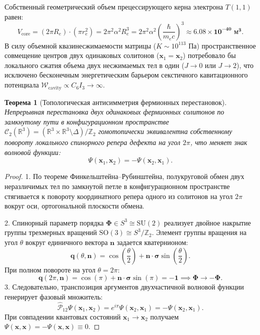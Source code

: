 \documentclass[11pt,a4paper]{article}
\newtheorem{theorem}{Теорема}[section]
\theoremstyle{definition}
\theoremstyle{remark}
\begin{document}
Собственный геометрический объем прецессирующего керна электрона $T(1,1)$ равен:
\begin{equation}
    V_{\mathrm{core}} = (2\pi R_e) \cdot (\pi r_e^2) = 2\pi^2 \alpha^2 R_e^3 = 2\pi^2 \alpha^2 \left( \frac{\hbar}{m_e c} \right)^3 \approx \mathbf{6.08 \times 10^{-40}\text{ м}^3}.
\end{equation}
В силу объемной квазинесжимаемости матрицы ($K \sim 10^{113}\text{ Па}$) пространственное совмещение центров двух одинаковых солитонов ($\mathbf{x}_1 = \mathbf{x}_2$) потребовало бы локального сжатия объема двух несжимаемых тел в один ($J \to 0$ или $J \to 2$), что исключено бесконечным энергетическим барьером секстичного кавитационного потенциала $\mathcal{W}_{\mathrm{cavity}} \propto C_6 I_3 \to \infty$.

\begin{theorem}[Топологическая антисимметрия фермионных перестановок]
Непрерывная перестановка двух одинаковых фермионных солитонов по замкнутому пути в конфигурационном пространстве $\mathcal{C}_2(\mathbb{R}^3) = (\mathbb{R}^3 \times \mathbb{R}^3 \setminus \Delta)/\mathbb{Z}_2$ гомотопически эквивалентна собственному повороту локального спинорного репера дефекта на угол $2\pi$, что меняет знак волновой функции:
\begin{equation}
    \Psi(\mathbf{x}_1, \mathbf{x}_2) = -\Psi(\mathbf{x}_2, \mathbf{x}_1).
    \label{eq:pauli_antisymmetry}
\end{equation}
\end{theorem}

\begin{proof}
1. По теореме Финкельштейна--Рубинштейна, полукруговой обмен двух неразличимых тел по замкнутой петле в конфигурационном пространстве стягивается к повороту координатного репера одного из солитонов на угол $2\pi$ вокруг оси, ортогональной плоскости обмена.

2. Спинорный параметр порядка $\boldsymbol{\Phi} \in S^3 \cong \mathrm{SU}(2)$ реализует двойное накрытие группы трехмерных вращений $\mathrm{SO}(3) \cong S^3 / \mathbb{Z}_2$. Элемент группы вращения на угол $\theta$ вокруг единичного вектора $\mathbf{n}$ задается кватернионом:
\begin{equation}
    \mathbf{q}(\theta, \mathbf{n}) = \cos\left(\frac{\theta}{2}\right) + \mathbf{n} \cdot \boldsymbol{\sigma} \sin\left(\frac{\theta}{2}\right).
\end{equation}
При полном повороте на угол $\theta = 2\pi$:
\begin{equation}
    \mathbf{q}(2\pi, \mathbf{n}) = \cos(\pi) + \mathbf{n} \cdot \boldsymbol{\sigma} \sin(\pi) = \mathbf{-1} \implies \boldsymbol{\Phi} \to -\boldsymbol{\Phi}.
\end{equation}
3. Следовательно, транспозиция аргументов двухчастичной волновой функции генерирует фазовый множитель:
\begin{equation}
    \hat{\mathcal{P}}_{12} \Psi(\mathbf{x}_1, \mathbf{x}_2) = e^{i\pi} \Psi(\mathbf{x}_2, \mathbf{x}_1) = -\Psi(\mathbf{x}_2, \mathbf{x}_1).
\end{equation}
При совпадении квантовых состояний $\mathbf{x}_1 \to \mathbf{x}_2$ получаем $\Psi(\mathbf{x}, \mathbf{x}) = -\Psi(\mathbf{x}, \mathbf{x}) \equiv 0$.
\end{proof}
\end{document}
